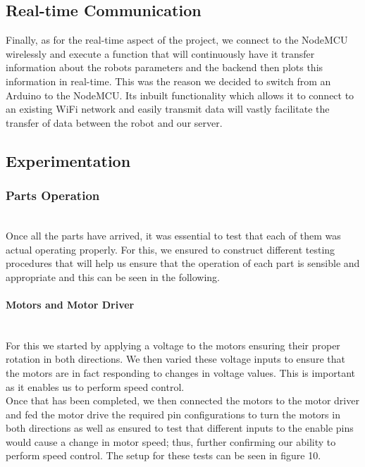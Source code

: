 \documentclass[conference]{IEEEtran}
\begin{document}
    \subsection{Real-time Communication}

    Finally, as for the real-time aspect of the project, we connect
    to the NodeMCU wirelessly and execute a function that will continuously
    have it transfer information about the robots parameters and the 
    backend then plots this
    information in real-time. This was the reason we decided to switch from
    an Arduino to the NodeMCU. Its inbuilt functionality which allows it to
    connect to an existing WiFi network and easily transmit
    data will vastly facilitate the transfer of data between the robot and our server.\\

    \subsection{Experimentation}

    \subsubsection{Parts Operation}

    ~~\\Once all the parts have arrived, it was essential to test that each of
    them was actual operating properly. For this, we ensured to construct different
    testing procedures that will help us ensure that the operation of each part is
    sensible and appropriate and this can be seen in the following.\\

    \paragraph{Motors and Motor Driver}

    ~~\\For this we started by applying a voltage to the motors ensuring their proper
    rotation in both directions. We then varied these voltage inputs to ensure that
    the motors are in fact responding to changes in voltage values. This is
    important as it enables us to perform speed control.\\
    
    Once that has been completed, we then connected the motors to the motor driver
    and fed the motor drive the required pin configurations to turn the motors in
    both directions as well as ensured to test that different inputs to the enable
    pins would cause a change in motor speed; thus, further confirming our ability
    to perform speed control. The setup for these tests can be seen in figure 10.\\
\end{document}

